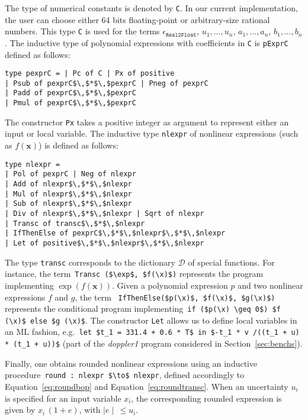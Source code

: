 \documentclass[preprint,fleqn,nocopyrightspace]{sigplanconf}
\newcommand{\code}[1]{\lstinline{#1}}
\newcommand{\setD}{\mathcal{D}} %
\newcommand{\x}{\mathbf{x}}
\newcommand{\realtofloat}{\mathtt{Real2Float}}
\theoremstyle{plain}
\begin{document}
The type of numerical constants is denoted by \code{C}. In our current implementation, the user can choose either 64 bits floating-point or arbitrary-size rational numbers. This type \code{C} is used for the terms $\epsilon_{\realtofloat}$, $u_1, \dots, u_n$, $a_1, \dots, a_n$, $b_1, \dots, b_n$.
%
The inductive type of polynomial expressions with coefficients in \code{C} is \code{pExprC} defined as follows:
\begin{lstlisting}
type pexprC = | Pc of C | Px of positive 
| Psub of pexprC$\,$*$\,$pexprC | Pneg of pexprC 
| Padd of pexprC$\,$*$\,$pexprC 
| Pmul of pexprC$\,$*$\,$pexprC
\end{lstlisting}
%
The constructor \code{Px} takes a positive integer as argument to represent either an input or local variable.
The inductive type \code{nlexpr} of nonlinear expressions (such as $f(\x)$) is defined as follows:
\begin{lstlisting}
type nlexpr = 
| Pol of pexprC | Neg of nlexpr
| Add of nlexpr$\,$*$\,$nlexpr 
| Mul of nlexpr$\,$*$\,$nlexpr 
| Sub of nlexpr$\,$*$\,$nlexpr 
| Div of nlexpr$\,$*$\,$nlexpr | Sqrt of nlexpr 
| Transc of transc$\,$*$\,$nlexpr
| IfThenElse of pexprC$\,$*$\,$nlexpr$\,$*$\,$nlexpr
| Let of positive$\,$*$\,$nlexpr$\,$*$\,$nlexpr
\end{lstlisting}
%
The type \code{transc} corresponds to the dictionary $\setD$ of special functions. For instance, the term~\lstinline|Transc ($\exp$, $f(\x)$)| represents the program implementing $\exp(f(\x))$.
Given a polynomial expression $p$ and two nonlinear expressions $f$ and $g$, the term ~\lstinline|IfThenElse($p(\x)$, $f(\x)$, $g(\x)$)| represents the conditional program implementing~\lstinline|if ($p(\x) \geq 0$) $f (\x)$ else $g (\x)$|. The constructor \code{Let} allows us to define local variables in an ML fashion, e.g.~\lstinline|let $t_1 = 331.4 + 0.6 * T$ in $-t_1 * v /((t_1 + u) * (t_1 + u))$| (part of the \textit{doppler1} program considered in Section~\ref{sec:benchs}).
%
%

Finally, one obtains rounded nonlinear expressions using an inductive procedure~\lstinline|round : nlexpr $\to$ nlexpr|, defined accordingly to Equation~\eqref{eq:roundbop} and Equation~\eqref{eq:roundtransc}. When an uncertainty $u_i$ is specified for an input variable $x_i$, the corresponding rounded expression is given by $x_i \, (1 + e)$, with $\mid e \mid \, \leq u_i$.
\end{document}
